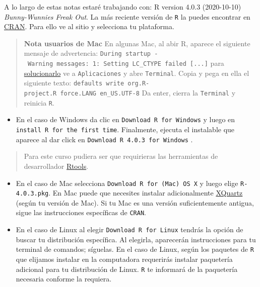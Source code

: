 \documentclass[
]{book}
\providecommand{\tightlist}{%
  \setlength{\itemsep}{0pt}\setlength{\parskip}{0pt}}
\begin{document}
A lo largo de estas notas estaré trabajando con: R version 4.0.3 (2020-10-10) \emph{Bunny-Wunnies Freak Out}. La más reciente versión de \texttt{R} la puedes encontrar en \href{https://cran.r-project.org}{CRAN}. Para ello ve al sitio y selecciona tu plataforma.

\begin{quote}
\textbf{Nota usuarios de Mac} En algunas Mac, al abir R, aparece el siguiente mensaje de advertencia:
\texttt{During\ startup\ -\ Warning\ messages:\ 1:\ Setting\ LC\_CTYPE\ failed\ {[}...{]}}
para \href{https://stackoverflow.com/questions/9689104/installing-r-on-mac-warning-messages-setting-lc-ctype-failed-using-c}{solucionarlo} ve a \texttt{Aplicaciones} y abre \texttt{Terminal}. Copia y pega en ella el siguiente texto:
\texttt{defaults\ write\ org.R-project.R\ force.LANG\ en\_US.UTF-8}
Da enter, cierra la \texttt{Terminal} y reinicia \texttt{R}.
\end{quote}

\begin{itemize}
\tightlist
\item
  En el caso de Windows da clic en \texttt{Download\ R\ for\ Windows} y luego en \texttt{install\ R\ for\ the\ first\ time}. Finalmente, ejecuta el instalable que aparece al dar click en \texttt{Download\ R\ 4.0.3\ for\ Windows} .
\end{itemize}

\begin{quote}
Para este curso pudiera ser que requirieras las herramientas de desarrollador \href{https://cran.r-project.org/bin/windows/Rtools/}{Rtools}.
\end{quote}

\begin{itemize}
\item
  En el caso de Mac selecciona \texttt{Download\ R\ for\ (Mac)\ OS\ X} y luego elige \texttt{R-4.0.3.pkg}. En Mac puede que necesites instalar adicionalmente \href{https://www.xquartz.org}{XQuartz} (según tu versión de Mac). Si tu Mac es una versión suficientemente antigua, sigue las instrucciones específicas de \texttt{CRAN}.
\item
  En el caso de Linux al elegir \texttt{Download\ R\ for\ Linux} tendrás la opción de buscar tu distribución específica. Al elegirla, aparecerán instrucciones para tu terminal de comandos; síguelas. En el caso de Linux, según los paquetes de \texttt{R} que elijamos instalar en la computadora requerirás instalar paquetería adicional para tu distribución de Linux. \texttt{R} te informará de la paquetería necesaria conforme la requiera.
\end{itemize}
\end{document}
